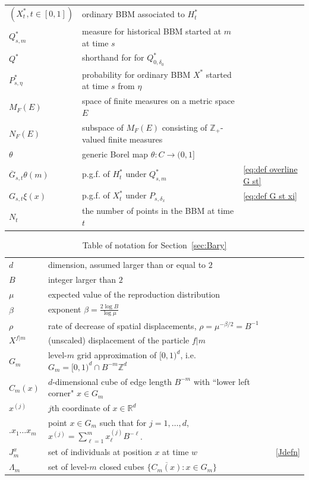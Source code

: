 \documentclass[12pt]{article}
\numberwithin{theorem}{section}
\theoremstyle{def}
\numberwithin{equation}{section}
\newcommand{\R}{\mathbb{R}}
\newcommand{\Z}{\mathbb{Z}}
\begin{document}
{\begin{table}[htbp]
\begin{tabular}{|l| l |l |}
		$(X^*_t, t \in [0,1])$ & ordinary BBM associated to $H^*_t$ & \\
		$Q^*_{s,m}$ & measure for historical BBM started at $m$ at time $s$ & \\
		$Q^*$ & shorthand for for $Q^*_{0,\delta_0}$ & \\
		$P^*_{s,\eta}$ & probability for ordinary BBM $X^*$ started at time $s$ from $\eta$ & \\
		$M_F(E)$ &space of finite measures on a metric space $E$  & \\
		$N_F(E)$ & subspace of $M_F(E)$ consisting of $\Z_+$-valued finite measures& \\
		$\theta$ & generic Borel map $\theta: C \rightarrow (0,1]$ & \\
		$\overline{G}_{s,t}\theta(m)$ & p.g.f. of $H_t^*$ under $Q^*_{s,m}$  & \eqref{eq:def overline G st}\\
		$G_{s,t}\xi(x)$ & p.g.f. of $X_t^*$ under $P_{s,\delta_x}$ & \eqref{eq:def G st xi}\\
		$N_t$ & the number of points in the BBM at time $t$ & \\
		\hline
	\end{tabular}
	\label{ton:introduction}
\end{table}
\begin{table}[htbp]\caption{Table of notation for Section~\ref{sec:Bary}}
	\centering 
	
	\begin{tabular}{|l| l |l |}
		\hline
		$d$ & dimension, assumed larger than or equal to $2$ &  \\		
		$B$ &   integer larger than $2$& \\
		$\mu$ &   expected value of the reproduction distribution& \\
		$\beta$ &   exponent $\beta =\frac{2\log B}{\log \mu}$ & \\
		$\rho$ &  rate of decrease of spatial displacements, $\rho=\mu^{-\beta/2}=B^{-1}$& \\
		\hline
		$X^{f|m}$ &   (unscaled) displacement of the particle $f|m$ & \\
		$G_m$ &  level-$m$ grid approximation of $[0,1)^d$, i.e. $G_m = [0,1)^d\cap B^{-m}\Z^d$& \\
		$C_m(x)$ &  $d$-dimensional cube of edge length $B^{-m}$ with ``lower left corner" $x\in G_m$& \\
		$x^{(j)}$ &  $j$th coordinate of $x\in\R^d$ & \\
		$.x_1\dots x_m$ &  point $x\in G_m$ such that for $j=1,\dots,d$, $x^{(j)}=\sum_{\ell=1}^mx_\ell^{(j)}B^{-\ell}$. & \\
		$J_m^x$ &  set of individuals at position $x$ at time $w$& \eqref{Jdefn}\\
		$\Lambda_m$ &  set of level-$m$ closed cubes $\{\overline{C_m(x)}:x\in G_m\}$ & \\
		\hline
	\end{tabular}
	\label{ton:Bary strm}
\end{table}
\newpage
}
\end{document}
